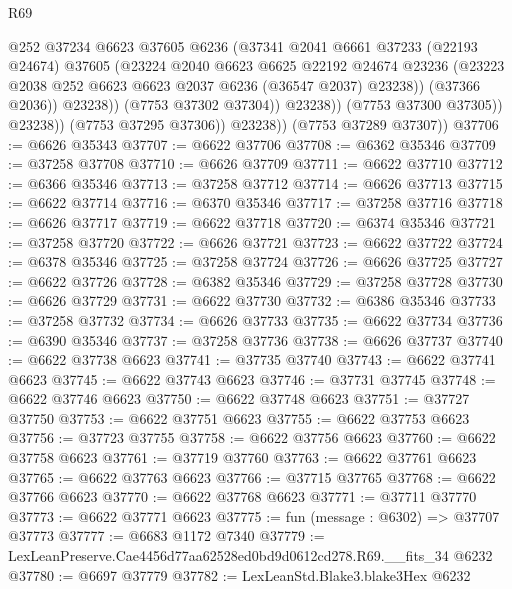 \begin{lexlean}{R69}
\begin{coremodule}
{                            @252
                            @37234
                            @6623
                            @37605
                            @6236
                            (@37341
                              @2041
                              @6661
                              @37233
                              (@22193 @24674)
                              @37605
                              (@23224
                                @2040
                                @6623
                                @6625
                                @22192
                                @24674
                                @23236
                                (@23223 @2038 @252 @6623 @6623 @2037 @6236 (@36547 @2037) @23238))
                              (@37366 @2036))
                            @23238))
                        (@7753 @37302 @37304))
                      @23238))
                  (@7753 @37300 @37305))
                @23238))
            (@7753 @37295 @37306))
          @23238))
      (@7753 @37289 @37307))
@37706 := @6626 @35343
@37707 := @6622 @37706
@37708 := @6362 @35346
@37709 := @37258 @37708
@37710 := @6626 @37709
@37711 := @6622 @37710
@37712 := @6366 @35346
@37713 := @37258 @37712
@37714 := @6626 @37713
@37715 := @6622 @37714
@37716 := @6370 @35346
@37717 := @37258 @37716
@37718 := @6626 @37717
@37719 := @6622 @37718
@37720 := @6374 @35346
@37721 := @37258 @37720
@37722 := @6626 @37721
@37723 := @6622 @37722
@37724 := @6378 @35346
@37725 := @37258 @37724
@37726 := @6626 @37725
@37727 := @6622 @37726
@37728 := @6382 @35346
@37729 := @37258 @37728
@37730 := @6626 @37729
@37731 := @6622 @37730
@37732 := @6386 @35346
@37733 := @37258 @37732
@37734 := @6626 @37733
@37735 := @6622 @37734
@37736 := @6390 @35346
@37737 := @37258 @37736
@37738 := @6626 @37737
@37740 := @6622 @37738 @6623
@37741 := @37735 @37740
@37743 := @6622 @37741 @6623
@37745 := @6622 @37743 @6623
@37746 := @37731 @37745
@37748 := @6622 @37746 @6623
@37750 := @6622 @37748 @6623
@37751 := @37727 @37750
@37753 := @6622 @37751 @6623
@37755 := @6622 @37753 @6623
@37756 := @37723 @37755
@37758 := @6622 @37756 @6623
@37760 := @6622 @37758 @6623
@37761 := @37719 @37760
@37763 := @6622 @37761 @6623
@37765 := @6622 @37763 @6623
@37766 := @37715 @37765
@37768 := @6622 @37766 @6623
@37770 := @6622 @37768 @6623
@37771 := @37711 @37770
@37773 := @6622 @37771 @6623
@37775 := fun (message : @6302) => @37707 @37773
@37777 := @6683 @1172 @7340
@37779 := LexLeanPreserve.Cae4456d77aa62528ed0bd9d0612cd278.R69.__fits_34 @6232
@37780 := @6697 @37779
@37782 := LexLeanStd.Blake3.blake3Hex @6232
}
\end{coremodule}
\end{lexlean}
